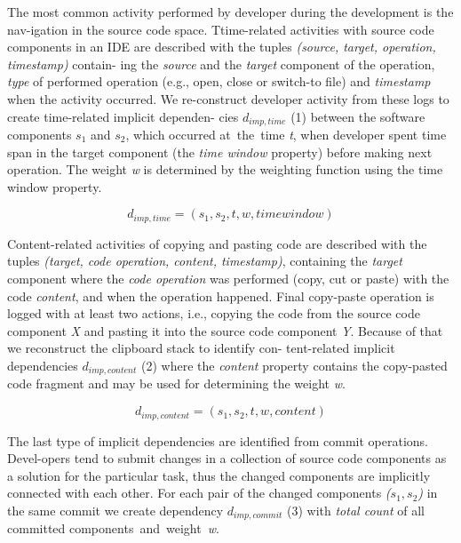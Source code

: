 \documentclass[a4paper]{llncs}
\begin{document}
\noindent The most common activity performed by developer during the development is the nav-igation in the source code space. Ttime-related activities with source code components in an IDE are described with the tuples \textit{(source, target, operation, timestamp)} contain- ing the \textit{source} and the \textit{target} component of the operation, \textit{type} of performed operation (e.g., open, close or switch-to file) and \textit{timestamp} when the activity occurred. We re-construct developer activity from these logs to create time-related implicit dependen- cies \textit{$d_{imp,time}$} (1) between the software components \textit{$s_{1}$} and \textit{$s_{2}$}, which occurred at~the~time \textit{t}, when developer spent time span in the target component (the \textit{time window} property) before making next operation. The weight \textit{w} is determined by the weighting function using the time window property.

\begin{equation}
d_{imp,time} = (s_{1},s_{2},t,w,time window)
\label{vzorec1}
\end{equation}

\noindent Content-related activities of copying and pasting code are described with the tuples \textit{(target, code operation, content, timestamp)}, containing the \textit{target} component where the \textit{code operation} was performed (copy, cut or paste) with the code \textit{content}, and when the operation happened. Final copy-paste operation is logged with at least two actions, i.e., copying the code from the source code component \textit{X} and pasting it into the source code component \textit{Y}. Because of that we reconstruct the clipboard stack to identify con- tent-related implicit dependencies \textit{$d_{imp,content}$} (2) where the \textit{content} property contains the copy-pasted code fragment and may be used for determining the weight \textit{w}.

\begin{equation}
d_{imp,content} = (s_{1},s_{2},t,w,content)
\label{vzorec2}
\end{equation}

\noindent The last type of implicit dependencies are identified from commit operations. Devel-opers tend to submit changes in a collection of source code components as a solution for the particular task, thus the changed components are implicitly connected with each other. For each pair of the changed components \textit{($s_{1},s_{2}$)} in the same commit we create dependency \textit{$d_{imp,commit}$} (3) with \textit{total count} of all committed components~and~weight~\textit{w}.
 
\end{document}
